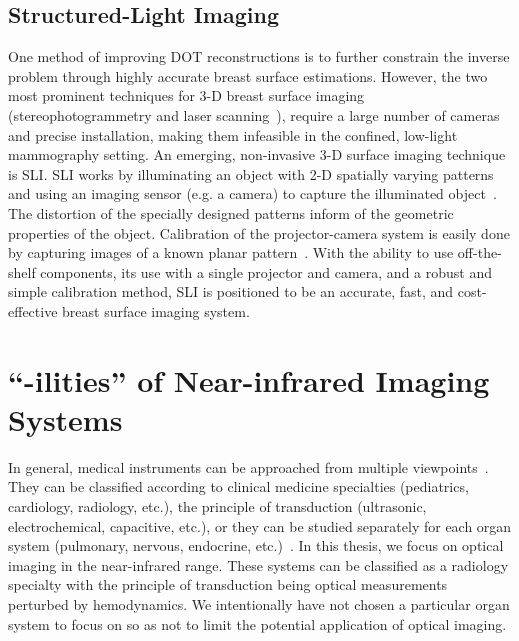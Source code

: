 \subsection{Structured-Light Imaging}
One method of improving \ac{DOT} reconstructions is to further constrain the inverse problem through highly accurate breast surface estimations. However, the two most prominent techniques for 3-D breast surface imaging (stereophotogrammetry and laser scanning~\cite{Yang2015}), require a large number of cameras and precise installation, making them infeasible in the confined, low-light mammography setting. An emerging, non-invasive 3-D surface imaging technique is \ac{SLI}. \ac{SLI} works by illuminating an object with 2-D spatially varying patterns and using an imaging sensor (e.g. a camera) to capture the illuminated object~\cite{Geng2011}. The distortion of the specially designed patterns inform of the geometric properties of the object. Calibration of the projector-camera system is easily done by capturing images of a known planar pattern~\cite{Moreno2012a}. With the ability to use off-the-shelf components, its use with a single projector and camera, and a robust and simple calibration method, SLI is positioned to be an accurate, fast, and cost-effective breast surface imaging system.



\section{``-ilities'' of Near-infrared Imaging Systems}
\label{chap:background:ilities}
In general, medical instruments can be approached from multiple viewpoints~\cite{Webster2010}. They can be classified according to clinical medicine specialties (pediatrics, cardiology, radiology, etc.), the principle of transduction (ultrasonic, electrochemical, capacitive, etc.), or they can be studied separately for each organ system (pulmonary, nervous, endocrine, etc.)~\cite{Bushberg2011}. In this thesis, we focus on optical imaging in the near-infrared range. These systems can be classified as a radiology specialty with the principle of transduction being optical measurements perturbed by hemodynamics. We intentionally have not chosen a particular organ system to focus on so as not to limit the potential application of optical imaging. 

